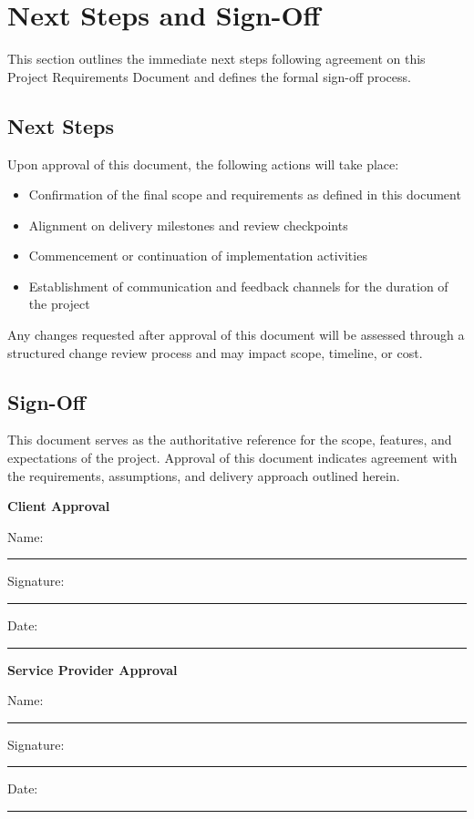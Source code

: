 \section{Next Steps and Sign-Off}

This section outlines the immediate next steps following agreement on this
Project Requirements Document and defines the formal sign-off process.

\subsection{Next Steps}

Upon approval of this document, the following actions will take place:
\begin{itemize}[leftmargin=1.5em]
    \item Confirmation of the final scope and requirements as defined in this
    document
    \item Alignment on delivery milestones and review checkpoints
    \item Commencement or continuation of implementation activities
    \item Establishment of communication and feedback channels for the duration
    of the project
\end{itemize}

Any changes requested after approval of this document will be assessed through
a structured change review process and may impact scope, timeline, or cost.

\subsection{Sign-Off}

This document serves as the authoritative reference for the scope, features,
and expectations of the project. Approval of this document indicates agreement
with the requirements, assumptions, and delivery approach outlined herein.

\vspace{1.5em}

\noindent\textbf{Client Approval}

\vspace{1em}

\noindent Name:\ \rule{8cm}{0.4pt}

\vspace{0.8em}

\noindent Signature:\ \rule{8cm}{0.4pt}

\vspace{0.8em}

\noindent Date:\ \rule{8cm}{0.4pt}

\vspace{2em}

\noindent\textbf{Service Provider Approval}

\vspace{1em}

\noindent Name:\ \rule{8cm}{0.4pt}

\vspace{0.8em}

\noindent Signature:\ \rule{8cm}{0.4pt}

\vspace{0.8em}

\noindent Date:\ \rule{8cm}{0.4pt}
